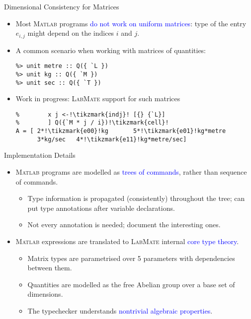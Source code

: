 \documentclass[]{beamer}
\newcommand{\tikzmark}[1]{\tikz[overlay,remember picture,baseline=-0.5ex] \node (#1) {};}
\newcommand{\keyword}[1]{\textcolor{blue}{#1}}
\newcommand{\lm}{\textsc{LabMate}\xspace}
\newcommand{\ma}{\textsc{Matlab}\xspace}
\begin{document}
\begin{frame}[fragile]{Dimensional Consistency for Matrices}
  \begin{itemize}[<+->]
  \item Most \ma programs \keyword{do not work on uniform matrices}: type of the entry $e_{i, j}$ might depend on the indices $i$ and $j$.
    \medskip
  \item A common scenario when working with matrices of quantities:
    \begin{lstlisting}[xleftmargin=0em]
%> dimensions V for Q over `L, `M, `T
%> unit metre :: Q({ `L })
%> unit kg :: Q({ `M })
%> unit sec :: Q({ `T })
    \end{lstlisting}
    \medskip
  \item Work in progress: \lm support for such matrices
    \begin{lstlisting}[xleftmargin=0em]
% > A :: [ i <-!\tikzmark{indi}! [{} {`T}]
%        x j <-!\tikzmark{indj}! [{} {`L}]
%        ] Q({`M * j / i})!\tikzmark{cell}!
A = [ 2*!\tikzmark{e00}!kg       5*!\tikzmark{e01}!kg*metre
      3*kg/sec   4*!\tikzmark{e11}!kg*metre/sec]
    \end{lstlisting}
  \end{itemize}
\end{frame}

\begin{frame}{Implementation Details}
  \begin{itemize}[<+->]
  \item \ma programs are modelled as \keyword{trees of commands}, rather than sequence of commands.
    \medskip
    \begin{itemize}
    \item Type information is propagated (consistently) throughout the tree; can put type annotations after variable declarations.
      \medskip
    \item Not every annotation is needed; document the interesting ones.
    \end{itemize}
    \medskip
  \item \ma expressions are translated to \lm internal \keyword{core type theory}.
    \medskip
    \begin{itemize}
    \item Matrix types are parametrised over 5 parameters with dependencies between them.
      \medskip
    \item Quantities are modelled as the free Abelian group over a base set of dimensions.
      \medskip
    \item The typechecker understands \keyword{nontrivial algebraic properties}.
    \end{itemize}
  \end{itemize}
\end{frame}
\end{document}
